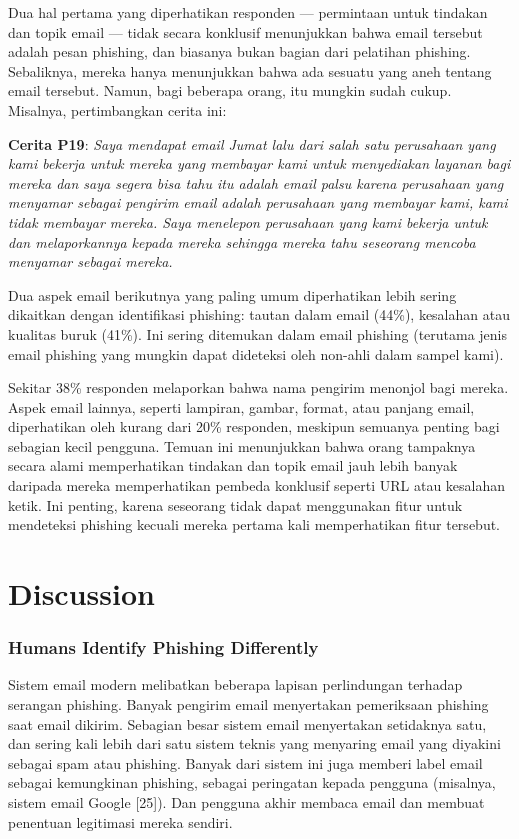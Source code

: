 \documentclass[lettersize,journal]{IEEEtran}
\begin{document}
Dua hal pertama yang diperhatikan responden — permintaan untuk tindakan dan
topik email — tidak secara konklusif menunjukkan bahwa email tersebut adalah
pesan phishing, dan biasanya bukan bagian dari pelatihan phishing. Sebaliknya,
mereka hanya menunjukkan bahwa ada sesuatu yang aneh tentang email tersebut.
Namun, bagi beberapa orang, itu mungkin sudah cukup. Misalnya, pertimbangkan
cerita ini:

\textbf{Cerita P19}: \textit{Saya mendapat email Jumat lalu dari salah satu perusahaan yang kami bekerja untuk mereka yang membayar kami untuk menyediakan layanan bagi mereka dan saya segera bisa tahu itu adalah email palsu karena perusahaan yang menyamar sebagai pengirim email adalah perusahaan yang membayar kami, kami tidak membayar mereka. Saya menelepon perusahaan yang kami bekerja untuk dan melaporkannya kepada mereka sehingga mereka tahu seseorang mencoba menyamar sebagai mereka.}

Dua aspek email berikutnya yang paling umum diperhatikan lebih sering dikaitkan
dengan identifikasi phishing: tautan dalam email (44\%), kesalahan atau
kualitas buruk (41\%). Ini sering ditemukan dalam email phishing (terutama
jenis email phishing yang mungkin dapat dideteksi oleh non-ahli dalam sampel
kami).

Sekitar 38\% responden melaporkan bahwa nama pengirim menonjol bagi mereka.
Aspek email lainnya, seperti lampiran, gambar, format, atau panjang email,
diperhatikan oleh kurang dari 20\% responden, meskipun semuanya penting bagi
sebagian kecil pengguna. Temuan ini menunjukkan bahwa orang tampaknya secara
alami memperhatikan tindakan dan topik email jauh lebih banyak daripada mereka
memperhatikan pembeda konklusif seperti URL atau kesalahan ketik. Ini penting,
karena seseorang tidak dapat menggunakan fitur untuk mendeteksi phishing
kecuali mereka pertama kali memperhatikan fitur tersebut.

\section{Discussion}

\subsubsection{Humans Identify Phishing Differently}
Sistem email modern melibatkan beberapa lapisan perlindungan terhadap serangan
phishing. Banyak pengirim email menyertakan pemeriksaan phishing saat email
dikirim. Sebagian besar sistem email menyertakan setidaknya satu, dan sering
kali lebih dari satu sistem teknis yang menyaring email yang diyakini sebagai
spam atau phishing. Banyak dari sistem ini juga memberi label email sebagai
kemungkinan phishing, sebagai peringatan kepada pengguna (misalnya, sistem
email Google [25]). Dan pengguna akhir membaca email dan membuat penentuan
legitimasi mereka sendiri.
\end{document}
